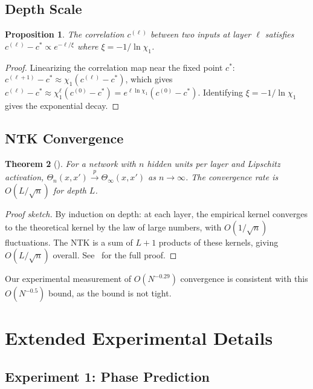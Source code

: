 \documentclass[10pt]{article}
\newtheorem{theorem}{Theorem}[section]
\newtheorem{proposition}[theorem]{Proposition}
\theoremstyle{definition}
\begin{document}
\subsection{Depth Scale}

\begin{proposition}
The correlation $c^{(\ell)}$ between two inputs at layer $\ell$ satisfies $c^{(\ell)} - c^* \propto e^{-\ell/\xi}$ where $\xi = -1/\ln\chi_1$.
\end{proposition}

\begin{proof}
Linearizing the correlation map near the fixed point $c^*$:
$c^{(\ell+1)} - c^* \approx \chi_1 (c^{(\ell)} - c^*)$,
which gives $c^{(\ell)} - c^* \approx \chi_1^\ell (c^{(0)} - c^*) = e^{\ell \ln \chi_1} (c^{(0)} - c^*)$.
Identifying $\xi = -1/\ln\chi_1$ gives the exponential decay.
\end{proof}

\subsection{NTK Convergence}

\begin{theorem}[\citet{jacot2018neural}]
For a network with $n$ hidden units per layer and Lipschitz activation, $\Theta_n(x, x') \xrightarrow{p} \Theta_\infty(x, x')$ as $n \to \infty$.
The convergence rate is $O(L/\sqrt{n})$ for depth $L$.
\end{theorem}

\begin{proof}[Proof sketch]
By induction on depth: at each layer, the empirical kernel converges to the theoretical kernel by the law of large numbers, with $O(1/\sqrt{n})$ fluctuations.
The NTK is a sum of $L+1$ products of these kernels, giving $O(L/\sqrt{n})$ overall.
See~\citet{jacot2018neural,yang2021tensor} for the full proof.
\end{proof}

Our experimental measurement of $O(N^{-0.29})$ convergence is consistent with this $O(N^{-0.5})$ bound, as the bound is not tight.

\section{Extended Experimental Details}
\label{app:extended}

\subsection{Experiment 1: Phase Prediction}
\end{document}
